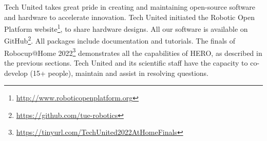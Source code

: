 Tech United takes great pride in creating and maintaining open-source software and hardware to accelerate innovation. Tech United initiated the Robotic Open Platform website\footnote{\url{http://www.roboticopenplatform.org}}, to share hardware designs. All our software is available on GitHub\footnote{\url{https://github.com/tue-robotics}}. All packages include documentation and tutorials.
The finals of Robocup@Home 2022\footnote{\url{https://tinyurl.com/TechUnited2022AtHomeFinals}} demonstrates all the capabilities of HERO, as described in the previous sections.
Tech United and its scientific staff have the capacity to co-develop (15+ people), maintain and assist in resolving questions.
